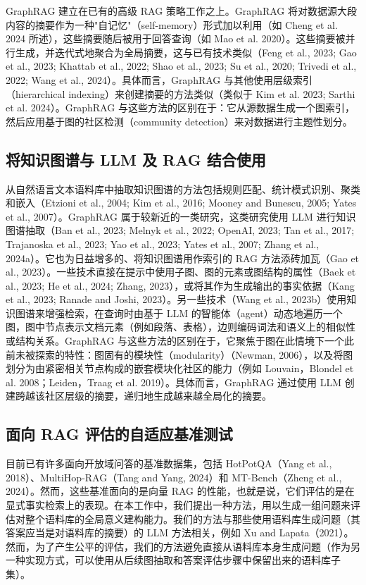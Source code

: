 \documentclass[11pt,UTF8,fontset=fandol]{ctexart}
\begin{document}
GraphRAG 建立在已有的高级 RAG 策略工作之上。GraphRAG 将对数据源大段内容的摘要作为一种"自记忆"（self-memory）形式加以利用（如 Cheng et al. 2024 所述），这些摘要随后被用于回答查询（如 Mao et al. 2020）。这些摘要被并行生成，并迭代式地聚合为全局摘要，这与已有技术类似（Feng et al., 2023; Gao et al., 2023; Khattab et al., 2022; Shao et al., 2023; Su et al., 2020; Trivedi et al., 2022; Wang et al., 2024）。具体而言，GraphRAG 与其他使用层级索引（hierarchical indexing）来创建摘要的方法类似（类似于 Kim et al. 2023; Sarthi et al. 2024）。GraphRAG 与这些方法的区别在于：它从源数据生成一个图索引，然后应用基于图的社区检测（community detection）来对数据进行主题性划分。

\subsection{将知识图谱与 LLM 及 RAG 结合使用}

从自然语言文本语料库中抽取知识图谱的方法包括规则匹配、统计模式识别、聚类和嵌入（Etzioni et al., 2004; Kim et al., 2016; Mooney and Bunescu, 2005; Yates et al., 2007）。GraphRAG 属于较新近的一类研究，这类研究使用 LLM 进行知识图谱抽取（Ban et al., 2023; Melnyk et al., 2022; OpenAI, 2023; Tan et al., 2017; Trajanoska et al., 2023; Yao et al., 2023; Yates et al., 2007; Zhang et al., 2024a）。它也为日益增多的、将知识图谱用作索引的 RAG 方法添砖加瓦（Gao et al., 2023）。一些技术直接在提示中使用子图、图的元素或图结构的属性（Baek et al., 2023; He et al., 2024; Zhang, 2023），或将其作为生成输出的事实依据（Kang et al., 2023; Ranade and Joshi, 2023）。另一些技术（Wang et al., 2023b）使用知识图谱来增强检索，在查询时由基于 LLM 的智能体（agent）动态地遍历一个图，图中节点表示文档元素（例如段落、表格），边则编码词法和语义上的相似性或结构关系。GraphRAG 与这些方法的区别在于，它聚焦于图在此情境下一个此前未被探索的特性：图固有的模块性（modularity）（Newman, 2006），以及将图划分为由紧密相关节点构成的嵌套模块化社区的能力（例如 Louvain，Blondel et al. 2008；Leiden，Traag et al. 2019）。具体而言，GraphRAG 通过使用 LLM 创建跨越该社区层级的摘要，递归地生成越来越全局化的摘要。

\subsection{面向 RAG 评估的自适应基准测试}

目前已有许多面向开放域问答的基准数据集，包括 HotPotQA（Yang et al., 2018）、MultiHop-RAG（Tang and Yang, 2024）和 MT-Bench（Zheng et al., 2024）。然而，这些基准面向的是向量 RAG 的性能，也就是说，它们评估的是在显式事实检索上的表现。在本工作中，我们提出一种方法，用以生成一组问题来评估对整个语料库的全局意义建构能力。我们的方法与那些使用语料库生成问题（其答案应当是对语料库的摘要）的 LLM 方法相关，例如 Xu and Lapata（2021）。然而，为了产生公平的评估，我们的方法避免直接从语料库本身生成问题（作为另一种实现方式，可以使用从后续图抽取和答案评估步骤中保留出来的语料库子集）。
\end{document}
